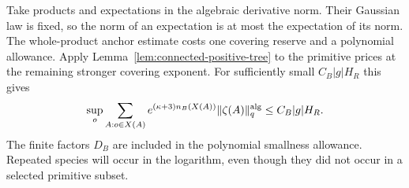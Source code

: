 \documentclass[11pt,reqno]{amsart}
\numberwithin{equation}{section}
\theoremstyle{definition}
\theoremstyle{remark}
\begin{document}
Take products and expectations in the
algebraic derivative norm.
Their Gaussian law is fixed, so the
norm of an expectation is at most the
expectation of its norm.
The whole-product anchor estimate costs
one covering reserve and a polynomial
allowance.
Apply Lemma~\ref{lem:connected-positive-tree}
to the primitive prices at the remaining
stronger covering exponent.
For sufficiently small \(C_B|g|H_R\) this
gives
\begin{equation}
       \sup_o\sum_{A:o\in X(A)}
          e^{(\kappa+3)n_B(X(A))}
                         \|\zeta(A)\|^{\rm alg}_q
                                   \le C_B|g|H_R .
 \label{eq:connected-polymer-incidence}
\end{equation}
The finite factors \(D_B\) are included
in the polynomial smallness allowance.
Repeated species will occur in the
logarithm, even though they did not
occur in a selected primitive subset.
\end{document}
